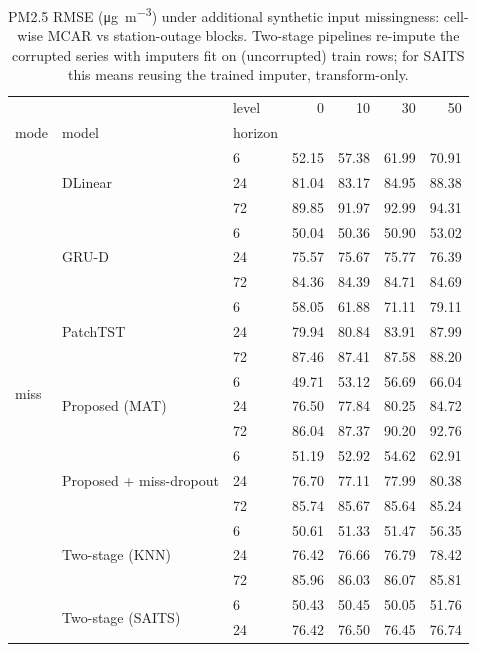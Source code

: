 \begin{table}
\caption{PM2.5 RMSE (\si{\micro\gram\per\cubic\metre}) under additional synthetic input missingness: cell-wise MCAR vs station-outage blocks. Two-stage pipelines re-impute the corrupted series with imputers fit on (uncorrupted) train rows; for SAITS this means reusing the trained imputer, transform-only.}
\label{tab:robustness}
\begin{tabular}{lllrrrr}
\toprule
 &  & level & 0 & 10 & 30 & 50 \\
mode & model & horizon &  &  &  &  \\
\midrule
\multirow[t]{21}{*}{miss} & \multirow[t]{3}{*}{DLinear} & 6 & 52.15 & 57.38 & 61.99 & 70.91 \\
 &  & 24 & 81.04 & 83.17 & 84.95 & 88.38 \\
 &  & 72 & 89.85 & 91.97 & 92.99 & 94.31 \\
\cline{2-7}
 & \multirow[t]{3}{*}{GRU-D} & 6 & 50.04 & 50.36 & 50.90 & 53.02 \\
 &  & 24 & 75.57 & 75.67 & 75.77 & 76.39 \\
 &  & 72 & 84.36 & 84.39 & 84.71 & 84.69 \\
\cline{2-7}
 & \multirow[t]{3}{*}{PatchTST} & 6 & 58.05 & 61.88 & 71.11 & 79.11 \\
 &  & 24 & 79.94 & 80.84 & 83.91 & 87.99 \\
 &  & 72 & 87.46 & 87.41 & 87.58 & 88.20 \\
\cline{2-7}
 & \multirow[t]{3}{*}{Proposed (MAT)} & 6 & 49.71 & 53.12 & 56.69 & 66.04 \\
 &  & 24 & 76.50 & 77.84 & 80.25 & 84.72 \\
 &  & 72 & 86.04 & 87.37 & 90.20 & 92.76 \\
\cline{2-7}
 & \multirow[t]{3}{*}{Proposed + miss-dropout} & 6 & 51.19 & 52.92 & 54.62 & 62.91 \\
 &  & 24 & 76.70 & 77.11 & 77.99 & 80.38 \\
 &  & 72 & 85.74 & 85.67 & 85.64 & 85.24 \\
\cline{2-7}
 & \multirow[t]{3}{*}{Two-stage (KNN)} & 6 & 50.61 & 51.33 & 51.47 & 56.35 \\
 &  & 24 & 76.42 & 76.66 & 76.79 & 78.42 \\
 &  & 72 & 85.96 & 86.03 & 86.07 & 85.81 \\
\cline{2-7}
 & \multirow[t]{3}{*}{Two-stage (SAITS)} & 6 & 50.43 & 50.45 & 50.05 & 51.76 \\
 &  & 24 & 76.42 & 76.50 & 76.45 & 76.74 \\

\end{tabular}
\end{table}

